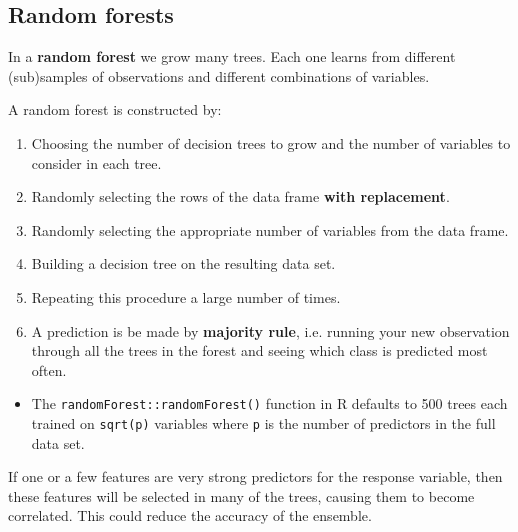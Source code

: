 \documentclass[a4paper]{article}
\begin{document}
\subsection{Random forests}
\begin{goldbox}
	In a \textbf{random forest} we grow many trees. Each one learns from different (sub)samples of observations and different combinations of variables.
\end{goldbox}
A random forest is constructed by:
\begin{enumerate}
	\item Choosing the number of decision trees to grow and the number of variables to consider in each tree.
	\item Randomly selecting the rows of the data frame \textbf{with replacement}.
	\item Randomly selecting the appropriate number of variables from the data frame.
	\item Building a decision tree on the resulting data set.
	\item Repeating this procedure a large number of times.
	\item A prediction is be made by \textbf{majority rule}, i.e. running your new observation through all the trees in the forest and seeing which class is predicted most often.
\end{enumerate}
\begin{itemize}
	\item The \lstinline|randomForest::randomForest()| function in R defaults to 500 trees each trained on \lstinline|sqrt(p)| variables where \lstinline|p| is the number of predictors in the full data set.
\end{itemize}
\begin{tcolorbox}[greenstylecolor, title=Why do we randomly select the features?]
	If one or a few features are very strong predictors for the response variable, then these features will be selected in many of the trees, causing them to become correlated. \textcolor{mygold}{This could reduce the accuracy of the ensemble}.
\end{tcolorbox}
\end{document}
